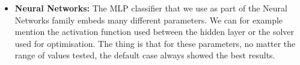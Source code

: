 \begin{itemize}
    \item \textbf{Neural Networks:} The MLP classifier that we use as part of the Neural Networks family embeds many different parameters. We can for example mention the activation function used between the hidden layer or the solver used for optimisation. The thing is that for these parameters, no matter the range of values tested, the default case always showed the best results.
    

\end{itemize}

